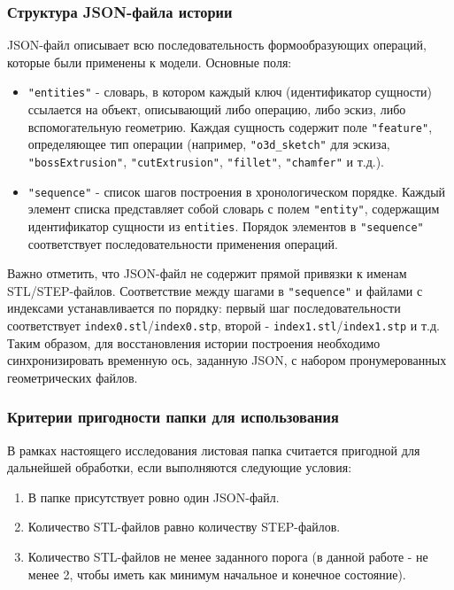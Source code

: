 \subsubsection{Структура JSON-файла истории}

JSON-файл описывает всю последовательность формообразующих операций, которые были применены к модели. Основные поля:

\begin{itemize}
    \item \texttt{"entities"} - словарь, в котором каждый ключ (идентификатор сущности) ссылается на объект, описывающий либо операцию, либо эскиз, либо вспомогательную геометрию. Каждая сущность содержит поле \texttt{"feature"}, определяющее тип операции (например, \texttt{"o3d\_sketch"} для эскиза, \texttt{"bossExtrusion"}, \texttt{"cutExtrusion"}, \texttt{"fillet"}, \texttt{"chamfer"} и т.д.).
    
    \item \texttt{"sequence"} - список шагов построения в хронологическом порядке. Каждый элемент списка представляет собой словарь с полем \texttt{"entity"}, содержащим идентификатор сущности из \texttt{entities}. Порядок элементов в \texttt{"sequence"} соответствует последовательности применения операций.
\end{itemize}

Важно отметить, что JSON-файл не содержит прямой привязки к именам STL/STEP-файлов. Соответствие между шагами в \texttt{"sequence"} и файлами с индексами устанавливается по порядку: первый шаг последовательности соответствует \texttt{index0.stl}/\texttt{index0.stp}, второй - \texttt{index1.stl}/\texttt{index1.stp} и т.д. Таким образом, для восстановления истории построения необходимо синхронизировать временную ось, заданную JSON, с набором пронумерованных геометрических файлов.

\subsubsection{Критерии пригодности папки для использования}

В рамках настоящего исследования листовая папка считается пригодной для дальнейшей обработки, если выполняются следующие условия:

\begin{enumerate}
    \item В папке присутствует ровно один JSON-файл.
    \item Количество STL-файлов равно количеству STEP-файлов.
    \item Количество STL-файлов не менее заданного порога (в данной работе - не менее 2, чтобы иметь как минимум начальное и конечное состояние).
\end{enumerate}

